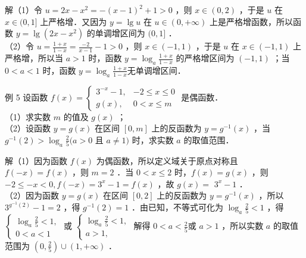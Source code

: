 \documentclass[10pt]{article}
\begin{document}
解（1）令 \(u=2 x-x^{2}=-(x-1)^{2}+1>0\) ，则 \(x \in(0,2)\) ，于是 \(u\) 在 \(x \in(0,1]\) 上严格增．又因为 \(y=\lg u\) 在 \(u \in(0,+\infty)\) 上是严格增函数，所以函数 \(y=\lg \left(2 x-x^{2}\right)\) 的单调增区间为 \((0,1]\) ．\\
（2）令 \(u=\frac{1+x}{1-x}=\frac{-2}{x-1}-1>0\) ，则 \(x \in(-1,1)\) ，于是 \(u\) 在 \(x \in(-1,1)\) 上严格增，所以当 \(a>1\) 时，函数 \(y=\log _{a} \frac{1+x}{1-x}\) 的严格增区间为 \((-1,1)\) ；当 \(0<a<1\) 时，函数 \(y=\log _{a} \frac{1+x}{1-x}\)无单调增区间．

例 5 设函数 \(f(x)=\left\{\begin{array}{ll}3^{-x}-1, & -2 \leqslant x \leqslant 0 \\ g(x), & 0<x \leqslant m\end{array}\right.\) 是偶函数．\\
（1）求实数 \(m\) 的值及 \(g(x)\) ；\\
（2）设函数 \(y=g(x)\) 在区间 \([0, m]\) 上的反函数为 \(y=g^{-1}(x)\) ，当 \(g^{-1}(2)>\log _{a} \frac{2}{5}(a>0\) 且 \(a \neq 1)\) 时，求实数 \(a\) 的取值范围．

解（1）因为函数 \(f(x)\) 为偶函数，所以定义域关于原点对称且 \(f(-x)=f(x)\) ，则 \(m=2\) ．当 \(0<x \leqslant 2\) 时，\(f(x)=g(x)\) ，则 \(-2 \leqslant-x<0, f(-x)=3^{x}-1=f(x)\) ，故 \(g(x)=\) \(3^{x}-1\) ．\\
（2）因为函数 \(y=g(x)\) 在区间 \([0,2]\) 上的反函数为 \(y=g^{-1}(x)\) ，所以 \(3^{g^{-1}(2)}-1=2\) ，得 \(g^{-1}(2)=1\) ．由已知，不等式可化为 \(\log _{a} \frac{2}{5}<1\) ，得 \(\left\{\begin{array}{l}\log _{a} \frac{2}{5}<1, \\ 0<a<1\end{array}\right.\) 或 \(\left\{\begin{array}{l}\log _{a} \frac{2}{5}<1, \\ a>1,\end{array}\right.\) 解得 \(0<a<\frac{2}{5}\)或 \(a>1\) ，所以实数 \(a\) 的取值范围为 \(\left(0, \frac{2}{5}\right) \cup(1,+\infty)\) ．
\end{document}

